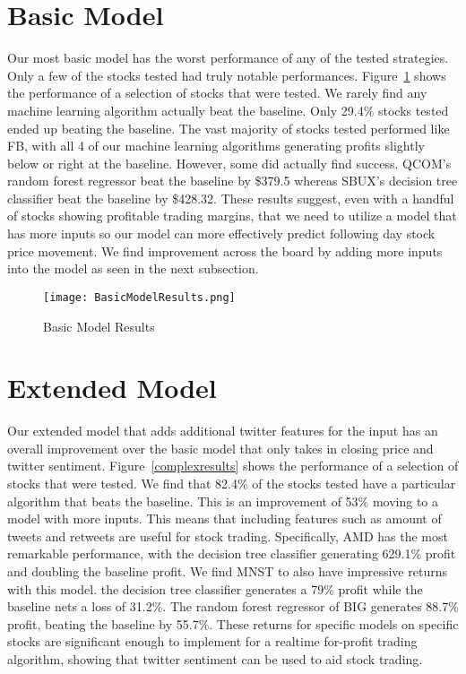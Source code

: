 \documentclass[../thesis.tex]{subfiles}
\begin{document}
\section{Basic Model}
Our most basic model has the worst performance of any of the tested strategies. Only a few of the stocks tested had truly notable performances. Figure~\ref{simpleresults} shows the performance of a selection of stocks that were tested. We rarely find any machine learning algorithm actually beat the baseline. Only 29.4\% stocks tested ended up beating the baseline. The vast majority of stocks tested performed like FB, with all 4 of our machine learning algorithms generating profits slightly below or right at the baseline. However, some did actually find success. QCOM's random forest regressor beat the baseline by \$379.5 whereas SBUX's decision tree classifier beat the baseline by \$428.32. These results suggest, even with a handful of stocks showing profitable trading margins, that we need to utilize a model that has more inputs so our model can more effectively predict following day stock price movement. We find improvement across the board by adding more inputs into the model as seen in the next subsection. 

\begin{figure}[h]
\centering
\texttt{[image: BasicModelResults.png]}
\caption{Basic Model Results \label{overflow}}
\label{simpleresults}
\end{figure}

\section{Extended Model}
Our extended model that adds additional twitter features for the input has an overall improvement over the basic model that only takes in closing price and twitter sentiment. Figure~\ref{complexresults} shows the performance of a selection of stocks that were tested. We find that 82.4\% of the stocks tested have a particular algorithm that beats the baseline. This is an improvement of 53\% moving to a model with more inputs. This means that including features such as amount of tweets and retweets are useful for stock trading. Specifically, AMD has the most remarkable performance, with the decision tree classifier generating 629.1\% profit and doubling the baseline profit. We find MNST to also have impressive returns with this model. the decision tree classifier generates a 79\% profit while the baseline nets a loss of 31.2\%. The random forest regressor of BIG generates 88.7\% profit, beating the baseline by 55.7\%. These returns for specific models on specific stocks are significant enough to implement for a realtime for-profit trading algorithm, showing that twitter sentiment can be used to aid stock trading.
\end{document}
